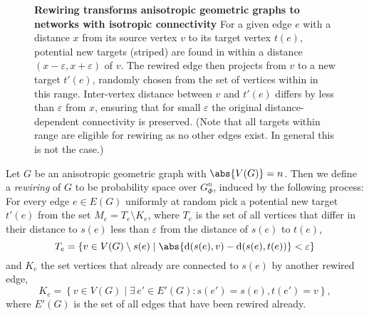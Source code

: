 \vspace{0.2cm}
\begin{figure}[!htb]
  \centering 
  \caption{\textbf{Rewiring transforms anisotropic geometric graphs to
      networks with isotropic connectivity} For a given edge $e$ with
    a distance $x$ from its source vertex $v$ to its target vertex
    $t(e)$, potential new targets (striped) are found in within a
    distance $(x-\varepsilon, x+\varepsilon)$ of $v$. The rewired edge
    then projects from $v$ to a new target $t'(e)$, randomly chosen
    from the set of vertices within in this range. Inter-vertex
    distance between $v$ and $t'(e)$ differs by less than
    $\varepsilon$ from $x$, ensuring that for small $\varepsilon$ the
    original distance-dependent connectivity is preserved. (Note that
    all targets within range are eligible for rewiring as no other
    edges exist. In general this is not the case.)}
  \label{fig:distance_rewiring}
\end{figure}


\begin{definition}
  \label{def:rewiring}
  Let $G$ be an anisotropic geometric graph with $\abs{V(G)} =
  n$. Then we define a \textit{rewiring} of $G$ to be probability space over
  $G^n_{\Phi}$, induced by the following process: For every edge $e
  \in E(G)$ uniformly at random pick a potential new target $t'(e)$
  from the set $M_e = T_e \setminus K_e$, where $T_e$ is the set of all
  vertices that differ in their distance to $s(e)$ less than
  $\varepsilon$ from the distance of $s(e)$ to $t(e)$,
  \[ 
  T_e = \left\{v \in V(G) \setminus s(e) \mid \abs{\mathrm{d}(s(e),v)
      - \mathrm{d}(s(e),t(e))} < \varepsilon \right\} %
  \]
  and $K_e$ the set vertices that already are connected to $s(e)$ by
  another rewired edge, 
  \[
  K_e = \left\{v \in V(G) \mid \exists\, e' \in E'(G): s(e') = s(e),
      t(e') =v \right\},
  \]
  where $E'(G)$ is the set of all edges that have been rewired already.
\end{definition}

